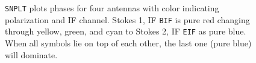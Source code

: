 \begin{figure}
\centering
\centerline{}
\vspace{12pt}
\centerline{}
\caption[{\tt SNPLT} with IFs/polarizations colored]{{\tt SNPLT} plots
phases for four antennas with color indicating polarization and IF
channel.  Stokes 1, IF {\tt BIF} is pure red changing through yellow,
green, and cyan to Stokes 2, IF {\tt EIF} as pure blue.  When all
symbols lie on top of each other, the last one (pure blue) will
dominate.}
\end{figure}
